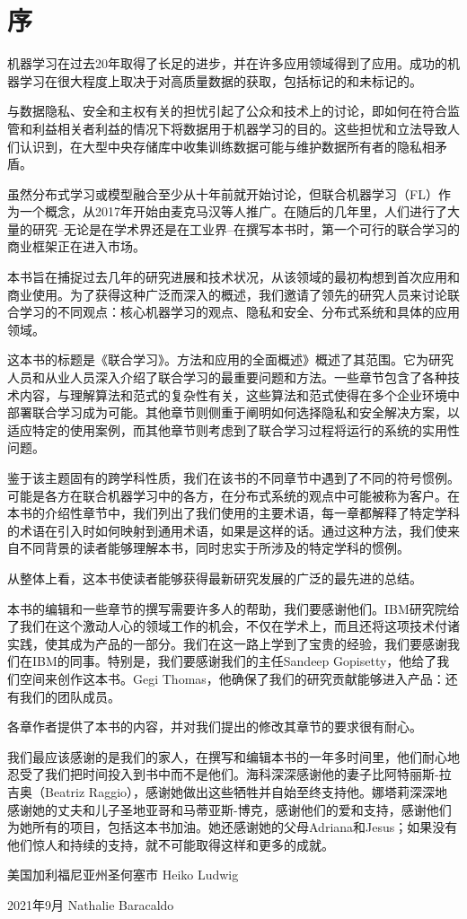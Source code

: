 \chapter*{序}
机器学习在过去20年取得了长足的进步，并在许多应用领域得到了应用。成功的机器学习在很大程度上取决于对高质量数据的获取，包括标记的和未标记的。

与数据隐私、安全和主权有关的担忧引起了公众和技术上的讨论，即如何在符合监管和利益相关者利益的情况下将数据用于机器学习的目的。这些担忧和立法导致人们认识到，在大型中央存储库中收集训练数据可能与维护数据所有者的隐私相矛盾。

虽然分布式学习或模型融合至少从十年前就开始讨论，但联合机器学习（FL）作为一个概念，从2017年开始由麦克马汉等人推广。在随后的几年里，人们进行了大量的研究--无论是在学术界还是在工业界--在撰写本书时，第一个可行的联合学习的商业框架正在进入市场。

本书旨在捕捉过去几年的研究进展和技术状况，从该领域的最初构想到首次应用和商业使用。为了获得这种广泛而深入的概述，我们邀请了领先的研究人员来讨论联合学习的不同观点：核心机器学习的观点、隐私和安全、分布式系统和具体的应用领域。

这本书的标题是《联合学习》。方法和应用的全面概述》概述了其范围。它为研究人员和从业人员深入介绍了联合学习的最重要问题和方法。一些章节包含了各种技术内容，与理解算法和范式的复杂性有关，这些算法和范式使得在多个企业环境中部署联合学习成为可能。其他章节则侧重于阐明如何选择隐私和安全解决方案，以适应特定的使用案例，而其他章节则考虑到了联合学习过程将运行的系统的实用性问题。

鉴于该主题固有的跨学科性质，我们在该书的不同章节中遇到了不同的符号惯例。可能是各方在联合机器学习中的各方，在分布式系统的观点中可能被称为客户。在本书的介绍性章节中，我们列出了我们使用的主要术语，每一章都解释了特定学科的术语在引入时如何映射到通用术语，如果是这样的话。通过这种方法，我们使来自不同背景的读者能够理解本书，同时忠实于所涉及的特定学科的惯例。

从整体上看，这本书使读者能够获得最新研究发展的广泛的最先进的总结。

本书的编辑和一些章节的撰写需要许多人的帮助，我们要感谢他们。IBM研究院给了我们在这个激动人心的领域工作的机会，不仅在学术上，而且还将这项技术付诸实践，使其成为产品的一部分。我们在这一路上学到了宝贵的经验，我们要感谢我们在IBM的同事。特别是，我们要感谢我们的主任Sandeep Gopisetty，他给了我们空间来创作这本书。Gegi Thomas，他确保了我们的研究贡献能够进入产品：还有我们的团队成员。

各章作者提供了本书的内容，并对我们提出的修改其章节的要求很有耐心。

我们最应该感谢的是我们的家人，在撰写和编辑本书的一年多时间里，他们耐心地忍受了我们把时间投入到书中而不是他们。海科深深感谢他的妻子比阿特丽斯-拉吉奥（Beatriz Raggio），感谢她做出这些牺牲并自始至终支持他。娜塔莉深深地感谢她的丈夫和儿子圣地亚哥和马蒂亚斯-博克，感谢他们的爱和支持，感谢他们为她所有的项目，包括这本书加油。她还感谢她的父母Adriana和Jesus；如果没有他们惊人和持续的支持，就不可能取得这样和更多的成就。

美国加利福尼亚州圣何塞市 \hfill Heiko Ludwig

2021年9月 \hfill Nathalie Baracaldo